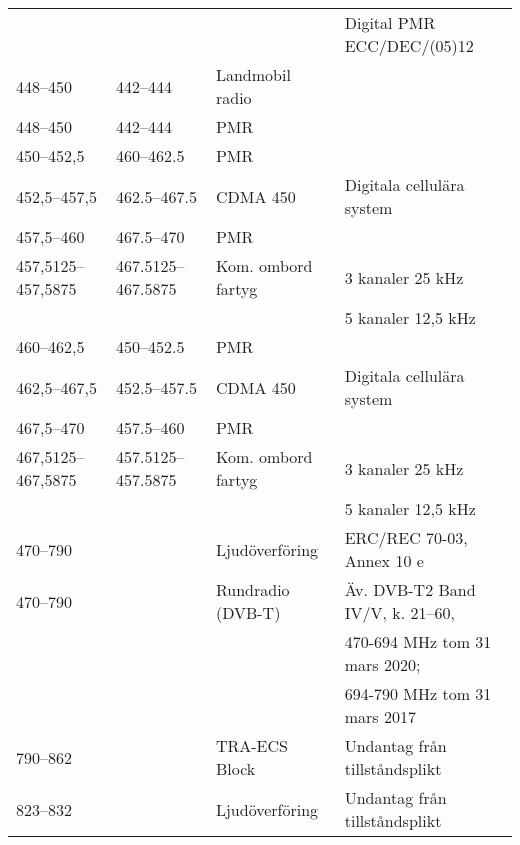 \begin{landscape}
\begin{longtable}{llll}
	                   &                    &                         & Digital PMR ECC/DEC/(05)12               \\
	448--450           & 442--444           & Landmobil radio         &  \\
	448--450           & 442--444           & PMR                     &  \\
	450--452,5         & 460--462.5         & PMR                     &  \\
	452,5--457,5       & 462.5--467.5       & CDMA 450                & Digitala cellulära system                \\
	457,5--460         & 467.5--470         & PMR                     &  \\
	457,5125--457,5875 & 467.5125--467.5875 & Kom. ombord fartyg      & 3 kanaler 25 kHz                         \\
	                   &                    &                         & 5 kanaler 12,5 kHz                       \\
	460--462,5         & 450--452.5         & PMR                     &  \\
	462,5--467,5       & 452.5--457.5       & CDMA 450                & Digitala cellulära system                \\
	467,5--470         & 457.5--460         & PMR                     &  \\
	467,5125--467,5875 & 457.5125--457.5875 & Kom. ombord  fartyg     & 3 kanaler 25 kHz                         \\
	                   &                    &                         & 5 kanaler 12,5 kHz                       \\
	470--790           &                    & Ljudöverföring          & ERC/REC 70-03, Annex 10 e                \\
	470--790           &                    & Rundradio (DVB-T)       & Äv. DVB-T2 Band IV/V, k. 21--60,         \\
	                   &                    &                         & 470-694 MHz tom 31 mars 2020;            \\
	                   &                    &                         & 694-790 MHz tom 31 mars 2017             \\
	790--862           &                    & TRA-ECS	Block           & Undantag från tillståndsplikt            \\
	823--832           &                    & Ljudöverföring          & Undantag från tillståndsplikt            \\

\end{longtable}
\end{landscape}

